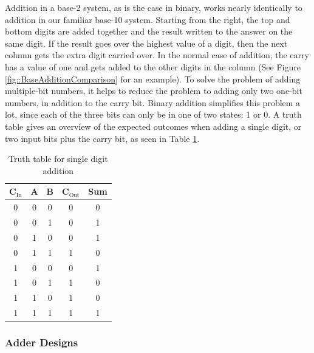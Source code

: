 Addition in a base-2 system, as is the case in binary, works nearly identically to addition in our familiar base-10 system. Starting from the right, the top and bottom digits are added together and the result written to the answer on the same digit. If the result goes over the highest value of a digit, then the next column gets the extra digit carried over. In the normal case of addition, the carry has a value of one and gets added to the other digits in the column (See Figure \ref{fig::BaseAdditionComparison} for an example). To solve the problem of adding multiple-bit numbers, it helps to reduce the problem to adding only two one-bit numbers, in addition to the carry bit. Binary addition simplifies this problem a lot, since each of the three bits can only be in one of two states: 1 or 0. A truth table gives an overview of the expected outcomes when adding a single digit, or two input bits plus the carry bit, as seen in Table \ref{tab::TruthTableOneBitAdder}.
\begin{table}
    \caption{Truth table for single digit addition}
    \label{tab::TruthTableOneBitAdder}
    \begin{center}
            \begin{tabular}{|c|c|c||c|c|}
                \hline C$_{\text{In}}$ & A & B & C$_{\text{Out}}$ & Sum\\ \hline
            0 & 0 & 0 & 0 & 0 \\
            0 & 0 & 1 & 0 & 1 \\
            0 & 1 & 0 & 0 & 1 \\
            0 & 1 & 1 & 1 & 0 \\
            1 & 0 & 0 & 0 & 1 \\
            1 & 0 & 1 & 1 & 0 \\
            1 & 1 & 0 & 1 & 0 \\
            1 & 1 & 1 & 1 & 1 \\\hline
        \end{tabular}
    \end{center}
\end{table}

\subsubsection{Adder Designs}

